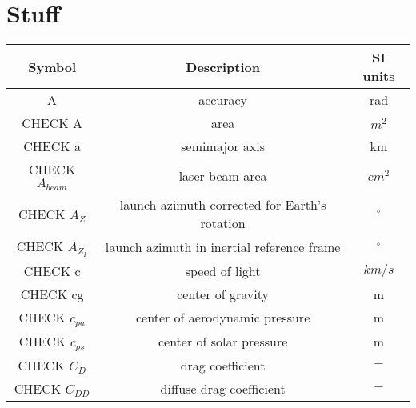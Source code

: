 \documentclass[11pt]{report}
\begin{document}
\chapter{Stuff}









\begin{center}
\begin{longtable}{c|c|c}

\textbf{Symbol} & \textbf{Description} & \textbf{SI units} \\\hline\hline
A																		& accuracy 																		& rad \\

CHECK A																		& area 																				& $m^2$ \\

CHECK a																		& semimajor axis 															& km \\

CHECK $A_{beam}$                        & laser beam area                               & $cm^2$ \\

CHECK $A_Z$                           & launch azimuth corrected for Earth's rotation  & $^\circ$ \\

CHECK $A_{Z_I}$                           & launch azimuth in inertial reference frame  & $^\circ$ \\

CHECK c                                     & speed of light                            & $km/s$ \\

CHECK cg                                    & center of gravity                         & m \\

CHECK $c_{pa}$                              & center of aerodynamic pressure            & m \\

CHECK $c_{ps}$                             & center of solar pressure                   & m \\

CHECK $C_D$																& drag coefficient 														& $-$ \\

CHECK $C_{DD}$													        & diffuse drag coefficient							& $-$ \\


\end{longtable}
\end{center}
\end{document}
